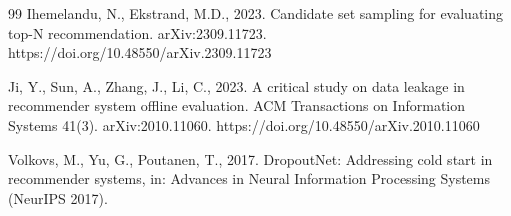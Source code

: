 \documentclass[preprint,12pt]{elsarticle}
\begin{document}
\begin{thebibliography}{99}
Ihemelandu, N., Ekstrand, M.D., 2023. Candidate set sampling for evaluating top-N recommendation. arXiv:2309.11723. https://doi.org/10.48550/arXiv.2309.11723

Ji, Y., Sun, A., Zhang, J., Li, C., 2023. A critical study on data leakage in recommender system offline evaluation. ACM Transactions on Information Systems 41(3). arXiv:2010.11060. https://doi.org/10.48550/arXiv.2010.11060

Volkovs, M., Yu, G., Poutanen, T., 2017. DropoutNet: Addressing cold start in recommender systems, in: Advances in Neural Information Processing Systems (NeurIPS 2017).

\end{thebibliography}
\end{document}
